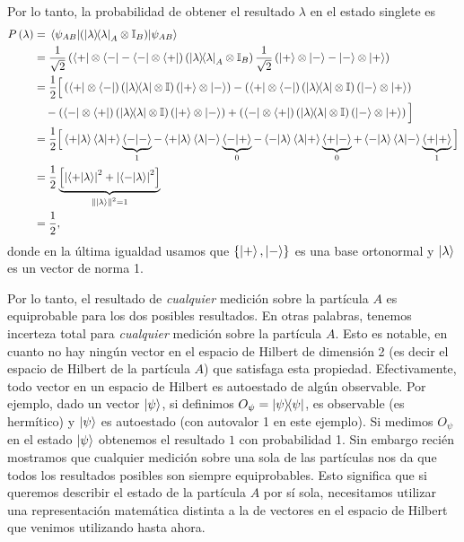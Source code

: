 \documentclass[10pt, a4paper]{article}
\numberwithin{equation}{subsection}
\begin{document}
Por lo tanto, la probabilidad de obtener el resultado $\lambda$ en el estado
singlete es
\begin{align}
  \Prob{\lambda}
  &= \matrixel{\psi_{AB}} {\left(\projector{\lambda}_A \tensor \Id_B\right)}
    {\psi_{AB}} \nonumber \\
  &= \frac{1}{\sqrt{2}} \left(\bra{+}\tensor\bra{-} -
    \bra{-}\tensor\bra{+}\right) \left(\projector{\lambda}_A \tensor
    \Id_B\right) \frac{1}{\sqrt{2}} \left(\ket{+}\tensor\ket{-} -
    \ket{-}\tensor\ket{+}\right) \nonumber \\
  &= \frac{1}{2} \Big[
    \left(\bra{+}\tensor\bra{-}\right)
    \left(\projector{\lambda} \tensor \Id\right)
    \left(\ket{+}\tensor\ket{-}\right)
    -
    \left(\bra{+}\tensor\bra{-}\right)
    \left(\projector{\lambda} \tensor \Id\right)
    \left(\ket{-}\tensor\ket{+}\right)
    \nonumber \\
    &\quad -
    \left(\bra{-}\tensor\bra{+}\right)
    \left(\projector{\lambda} \tensor \Id\right)
    \left(\ket{+}\tensor\ket{-}\right)
    +
    \left(\bra{-}\tensor\bra{+}\right)
    \left(\projector{\lambda} \tensor \Id\right)
    \left(\ket{-}\tensor\ket{+}\right)
    \Big] \nonumber \\
  &= \frac{1}{2} \Big[
    \braket{+}{\lambda}\braket{\lambda}{+}
    \underbrace{\braket{-}{-}}_{1}
    -
    \braket{+}{\lambda}\braket{\lambda}{-}
    \underbrace{\braket{-}{+}}_{0}
    -
    \braket{-}{\lambda}\braket{\lambda}{+}
    \underbrace{\braket{+}{-}}_{0}
    +
    \braket{-}{\lambda}\braket{\lambda}{-}
    \underbrace{\braket{+}{+}}_{1}
    \Big] \nonumber \\
  &= \frac{1}{2} \underbrace{\Big[ \abs{\braket{+}{\lambda}}^2 +
    \abs{\braket{-}{\lambda}}^2\Big]}_{\norm{\ket{\lambda}}^2 = 1}
    \nonumber \\
  &= \frac{1}{2},
\end{align}
donde en la última igualdad usamos que $\set{\ket{+}, \ket{-}}$ es una base
ortonormal y $\ket{\lambda}$ es un vector de norma 1.

Por lo tanto, el resultado de \emph{cualquier} medición sobre la partícula $A$
es equiprobable para los dos posibles resultados. En otras palabras, tenemos
incerteza total para \emph{cualquier} medición sobre la partícula $A$. Esto es
notable, en cuanto no hay ningún vector en el espacio de Hilbert de dimensión 2
(es decir el espacio de Hilbert de la partícula $A$) que satisfaga esta
propiedad. Efectivamente, todo vector en un espacio de Hilbert es autoestado de
algún observable. Por ejemplo, dado un vector $\ket{\psi}$, si definimos
$O_{\psi} = \projector{\psi}$, es observable (es hermítico) y $\ket{\psi}$ es
autoestado (con autovalor 1 en este ejemplo). Si medimos $O_{\psi}$ en el
estado $\ket{\psi}$ obtenemos el resultado $1$ con probabilidad 1. Sin embargo
recién mostramos que cualquier medición sobre una sola de las partículas nos da
que todos los resultados posibles son siempre equiprobables. Esto significa
que si queremos describir el estado de la partícula $A$ por sí sola,
necesitamos utilizar una representación matemática distinta a la de vectores
en el espacio de Hilbert que venimos utilizando hasta ahora.
\end{document}

